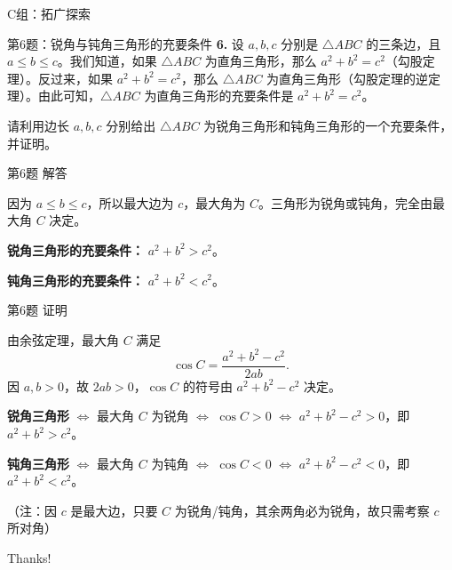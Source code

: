 \documentclass[10pt,aspectratio=169,serif]{beamer}
\begin{document}
\begin{frame}[t]{C组：拓广探索}
\end{frame}

\begin{frame}[t]{第6题：锐角与钝角三角形的充要条件}
\textbf{6.} 设 $a,b,c$ 分别是 $\triangle ABC$ 的三条边，且 $a\le b\le c$。我们知道，如果 $\triangle ABC$ 为直角三角形，那么 $a^2+b^2=c^2$（勾股定理）。反过来，如果 $a^2+b^2=c^2$，那么 $\triangle ABC$ 为直角三角形（勾股定理的逆定理）。由此可知，$\triangle ABC$ 为直角三角形的充要条件是 $a^2+b^2=c^2$。

\vspace{0.5em}
请利用边长 $a,b,c$ 分别给出 $\triangle ABC$ 为锐角三角形和钝角三角形的一个充要条件，并证明。
\end{frame}

\begin{frame}[t]{第6题 解答}
\begin{tcolorbox}[colback=orange!10,colframe=orange,title=\textbf{结论}]
因为 $a\le b\le c$，所以最大边为 $c$，最大角为 $C$。三角形为锐角或钝角，完全由最大角 $C$ 决定。

\vspace{0.5em}
\textbf{锐角三角形的充要条件：} $a^2+b^2 > c^2$。

\vspace{0.5em}
\textbf{钝角三角形的充要条件：} $a^2+b^2 < c^2$。
\end{tcolorbox}
\end{frame}

\begin{frame}[t]{第6题 证明}
\begin{tcolorbox}[colback=orange!10,colframe=orange,title=\textbf{证明（余弦定理）}]
由余弦定理，最大角 $C$ 满足
\[
\cos C = \frac{a^2+b^2-c^2}{2ab}.
\]
因 $a,b>0$，故 $2ab>0$，$\cos C$ 的符号由 $a^2+b^2-c^2$ 决定。

\vspace{0.5em}
\textbf{锐角三角形} $\Longleftrightarrow$ 最大角 $C$ 为锐角 $\Longleftrightarrow$ $\cos C>0$ $\Longleftrightarrow$ $a^2+b^2-c^2>0$，即 $a^2+b^2>c^2$。

\vspace{0.5em}
\textbf{钝角三角形} $\Longleftrightarrow$ 最大角 $C$ 为钝角 $\Longleftrightarrow$ $\cos C<0$ $\Longleftrightarrow$ $a^2+b^2-c^2<0$，即 $a^2+b^2<c^2$。

\vspace{0.5em}
\small（注：因 $c$ 是最大边，只要 $C$ 为锐角/钝角，其余两角必为锐角，故只需考察 $c$ 所对角）
\end{tcolorbox}
\end{frame}

\begin{frame}[c]
  \begin{center}
    {\Huge\calligra Thanks!}
  \end{center}
\end{frame}
\end{document}
